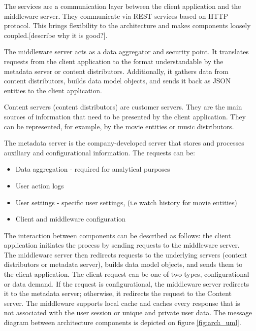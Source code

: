 The services are a communication layer between the client application and the middleware server. They communicate via REST services based on HTTP protocol. This brings flexibility to the architecture and makes components loosely coupled.[describe why it is good?]. 

The middleware server acts as a data aggregator and security point. It translates requests from the client application to the format understandable by the metadata server or content distributors. Additionally, it gathers data from content distributors, builds data model objects, and sends it back as JSON entities to the client application.

Content servers (content distributors) are customer servers. They are the main sources of information that need to be presented by the client application. They can be represented, for example, by the movie entities or music distributors.

The metadata server is the company-developed server that stores and processes auxiliary and configurational information. The requests can be: 

\begin{itemize}
	\item Data aggregation - required for analytical purposes
	\item User action logs 
	\item User settings - specific user settings, (i.e watch history for movie entities)
	\item Client and middleware configuration
\end{itemize} 

The interaction between components can be described as follows: the client application initiates the process by  sending requests to the middleware server. The middleware server then redirects requests to the underlying servers (content distributors or metadata server), builds data model objects, and sends them to the client application. The client request can be one of two types, configurational or data demand. If the request is configurational, the middleware server redirects it to the metadata server; otherwise, it redirects the request to the Content server. The middleware supports local cache and caches every response that is not associated with the user session or unique and private user data. The message diagram between architecture components is depicted on figure \ref{fig:arch_uml}.


